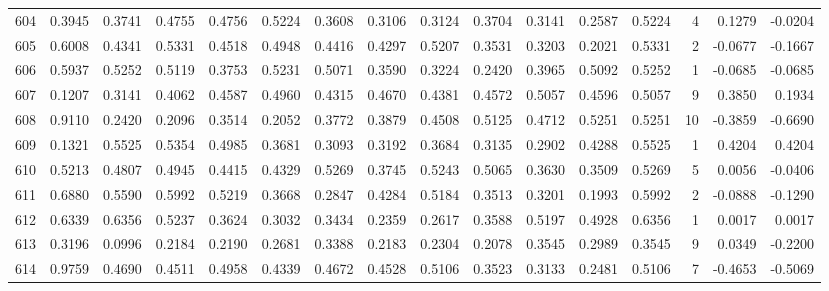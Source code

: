 \begin{tabular}{lrrrrrrrrrrrrrrr}
604 &      0.3945 &  0.3741 &  0.4755 &  0.4756 &  0.5224 &  0.3608 &  0.3106 &  0.3124 &  0.3704 &  0.3141 &   0.2587 &     0.5224 &      4 &                    0.1279 &                    -0.0204 \\
605 &      0.6008 &  0.4341 &  0.5331 &  0.4518 &  0.4948 &  0.4416 &  0.4297 &  0.5207 &  0.3531 &  0.3203 &   0.2021 &     0.5331 &      2 &                   -0.0677 &                    -0.1667 \\
606 &      0.5937 &  0.5252 &  0.5119 &  0.3753 &  0.5231 &  0.5071 &  0.3590 &  0.3224 &  0.2420 &  0.3965 &   0.5092 &     0.5252 &      1 &                   -0.0685 &                    -0.0685 \\
607 &      0.1207 &  0.3141 &  0.4062 &  0.4587 &  0.4960 &  0.4315 &  0.4670 &  0.4381 &  0.4572 &  0.5057 &   0.4596 &     0.5057 &      9 &                    0.3850 &                     0.1934 \\
608 &      0.9110 &  0.2420 &  0.2096 &  0.3514 &  0.2052 &  0.3772 &  0.3879 &  0.4508 &  0.5125 &  0.4712 &   0.5251 &     0.5251 &     10 &                   -0.3859 &                    -0.6690 \\
609 &      0.1321 &  0.5525 &  0.5354 &  0.4985 &  0.3681 &  0.3093 &  0.3192 &  0.3684 &  0.3135 &  0.2902 &   0.4288 &     0.5525 &      1 &                    0.4204 &                     0.4204 \\
610 &      0.5213 &  0.4807 &  0.4945 &  0.4415 &  0.4329 &  0.5269 &  0.3745 &  0.5243 &  0.5065 &  0.3630 &   0.3509 &     0.5269 &      5 &                    0.0056 &                    -0.0406 \\
611 &      0.6880 &  0.5590 &  0.5992 &  0.5219 &  0.3668 &  0.2847 &  0.4284 &  0.5184 &  0.3513 &  0.3201 &   0.1993 &     0.5992 &      2 &                   -0.0888 &                    -0.1290 \\
612 &      0.6339 &  0.6356 &  0.5237 &  0.3624 &  0.3032 &  0.3434 &  0.2359 &  0.2617 &  0.3588 &  0.5197 &   0.4928 &     0.6356 &      1 &                    0.0017 &                     0.0017 \\
613 &      0.3196 &  0.0996 &  0.2184 &  0.2190 &  0.2681 &  0.3388 &  0.2183 &  0.2304 &  0.2078 &  0.3545 &   0.2989 &     0.3545 &      9 &                    0.0349 &                    -0.2200 \\
614 &      0.9759 &  0.4690 &  0.4511 &  0.4958 &  0.4339 &  0.4672 &  0.4528 &  0.5106 &  0.3523 &  0.3133 &   0.2481 &     0.5106 &      7 &                   -0.4653 &                    -0.5069 \\

\end{tabular}
